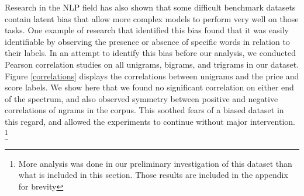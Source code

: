 \documentclass[10pt]{IEEEtran}
\begin{document}
    Research in the NLP field has also shown that some difficult benchmark datasets contain latent bias that allow more complex models to perform very well on those tasks. One example of research that identified this bias found that it was easily identifiable by observing the presence or absence of specific words in relation to their labels\cite{clever_hans}. In an attempt to identify this bias before our analysis, we conducted Pearson correlation studies on all unigrams, bigrams, and trigrams in our dataset. Figure \ref{correlations} displays the correlations between unigrams and the price and score labels. We show here that we found no significant correlation on either end of the spectrum, and also observed symmetry between positive and negative correlations of ngrams in the corpus. This soothed fears of a biased dataset in this regard, and allowed the experiments to continue without major intervention.
    \footnote{More analysis was done in our preliminary investigation of this dataset than what is included in this section. Those results are included in the appendix for brevity} \par
\end{document}
